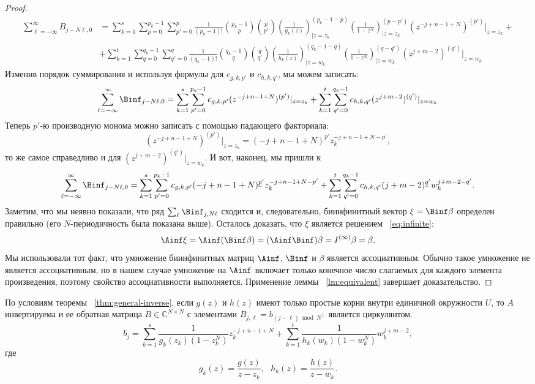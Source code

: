 \begin{proof}
\begin{align*}
	\sum_{\ell=-\infty}^{\infty}B_{j-N\ell, 0} 
	&=
	\sum_{k=1}^s\sum_{p=0}^{p_k-1}\sum_{p'=0}^p\frac{1}{(p_k - 1)!}\binom{p_k-1}{p}\binom{p}{p'}
	\left(\frac{1}{g_k(z)}\right)^{(p_k-1-p)}_{\big|{z=z_k}}
	\left(\frac{1}{1-z^{N}}\right)^{(p-p')}_{\big|{z=z_k}}
	(z^{-j+n-1+N})^{(p')}|_{z=z_k}
	+\\&+
	\sum_{k=1}^t\sum_{q=0}^{q_k-1}\sum_{q'=0}^q
	\frac{1}{(q_k - 1)!}\binom{q_k-1}{q}\binom{q}{q'}
	\left(\frac{1}{h_k(z)}\right)^{(q_k-1-q)}_{\big|{z=w_k}}
	\left(\frac{1}{1-z^{N}}\right)^{(q-q')}_{\big|{z=w_k}}
	(z^{j+m-2})^{(q')}|_{z=w_k}
	\end{align*}
	Изменив порядок суммирования и используя формулы для $c_{g,k,p'}$ и $c_{h,k,q'}$, мы можем записать:
	\[
	\sum_{\ell=-\infty}^{\infty}\Binf_{j-N\ell, 0} 
	=
	\sum_{k=1}^s\sum_{p'=0}^{p_k-1}
	c_{g,k,p'}
	(z^{-j+n-1+N})^{(p')}|_{z=z_k}
	+
	\sum_{k=1}^t\sum_{q'=0}^{q_k-1}
	c_{h,k,q'}
	(z^{j+m-2})^{(q')}|_{z=w_k}
	\]
	Теперь $p'$-ю производную монома можно записать с помощью падающего факториала:
	\[
	(z^{-j+n-1+N})^{(p')}|_{z=z_k} = (-j+n-1+N)^{\underline{p}'} z_k^{-j+n-1+N-p'},
	\]
	то же самое справедливо и для $(z^{j+m-2})^{(q')}|_{z=w_k}$.
	И вот, наконец, мы пришли к
	\[
	\sum_{\ell=-\infty}^{\infty}\Binf_{j-N\ell, 0} 
	=
	\sum_{k=1}^s\sum_{p'=0}^{p_k-1}
	c_{g,k,p'}
	(-j+n-1+N)^{\underline{p}'} z_k^{-j+n-1+N-p'}
	+
	\sum_{k=1}^t\sum_{q'=0}^{q_k-1}
	c_{h,k,q'}
	(j+m-2)^{\underline{q}'}w_k^{j+m-2-q'}.
	\]
	Заметим, что мы неявно показали, что ряд $\sum_{\ell}\Binf_{j, N\ell}$ сходится и, следовательно, биинфинитный вектор $\xi = \Binf\beta$ определен правильно (его $N$-периодичность была показана выше).
	Осталось доказать, что $\xi$ является решением ~\eqref{eq:infinite}:
	\[
	\Ainf\xi = \Ainf(\Binf\beta) = (\Ainf\Binf)\beta = I^{(\infty)}\beta  =\beta.
	\]
	Мы использовали тот факт, что умножение биинфинитных матриц $\Ainf$, $\Binf$ и $\beta$ является ассоциативным.
	Обычно такое умножение не является ассоциативным, но в нашем случае умножение на $\Ainf$ включает только конечное число слагаемых для каждого элемента произведения, поэтому свойство ассоциативности выполняется.
	Применение леммы ~\ref{lm:equivalent} завершает доказательство.
\end{proof}
\begin{corollary}\label{cor:simple-roots}
	По условиям теоремы ~\ref{thm:general-inverse}, если $g(z)$ и $h(z)$ имеют только простые корни внутри единичной окружности $U$, то $A$ инвертируема и ее обратная матрица $B\in\mathbb{C}^{N\times N}$ с элементами $B_{j,\ell} = b_{(j-\ell)\bmod N}:$ является циркулянтом.
	\[
	b_j
	=
	\sum_{k=1}^s
	\frac{1}{g_k(z_k)(1-z_k^{N})}
	z_k^{-j+n-1+N}
	+
	\sum_{k=1}^t
	\frac{1}{h_k(w_k)(1-w_k^{N})}
	w_k^{j+m-2},
	\]
	где
	\[
	g_k(z) = \frac{g(z)}{z-z_k},~~~
	h_k(z) = \frac{h(z)}{z-w_k}.
	\]
\end{corollary}
